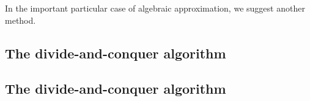 \documentclass{sig-alternate}
\begin{document}
In the important particular case of algebraic approximation,
we suggest another method.


\subsection{The divide-and-conquer algorithm}


\subsection{The divide-and-conquer algorithm}





 {\scriptsize }
\end{document}
